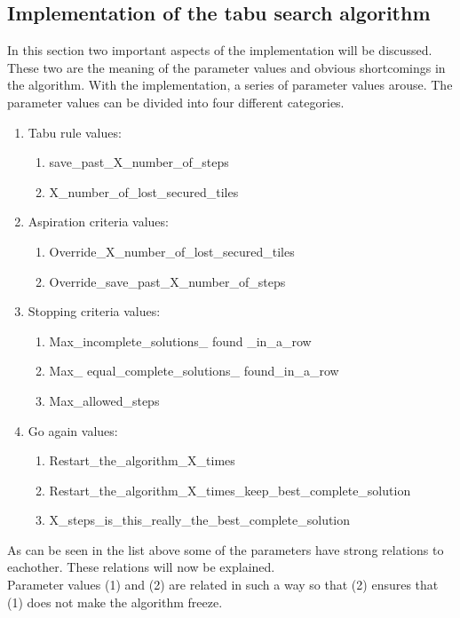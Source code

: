 \subsection{Implementation of the tabu search algorithm}
In this section two important aspects of the implementation will be discussed. These two are the meaning of the parameter values and obvious shortcomings in the algorithm. With the implementation, a series of parameter values arouse. The parameter values can be divided into four different categories.
\begin{enumerate}
\item{} Tabu rule values:
\begin{enumerate}
\item{} save\_past\_X\_number\_of\_steps
\item{} X\_number\_of\_lost\_secured\_tiles
\end{enumerate} 
\item{} Aspiration criteria values:
\begin{enumerate}
\item{} Override\_X\_number\_of\_lost\_secured\_tiles
\item{} Override\_save\_past\_X\_number\_of\_steps
\end{enumerate} 
\item{} Stopping criteria values:
\begin{enumerate}
\item{} Max\_incomplete\_solutions\_ found \_in\_a\_row
\item{} Max\_ equal\_complete\_solutions\_ found\_in\_a\_row
\item{} Max\_allowed\_steps
\end{enumerate} 
\item{} Go again values:
\begin{enumerate}
\item{} Restart\_the\_algorithm\_X\_times
\item{} Restart\_the\_algorithm\_X\_times\_keep\_best\_complete\_solution
\item{} X\_steps\_is\_this\_really\_the\_best\_complete\_solution
\end{enumerate} 
\end{enumerate} 
As can be seen in the list above some of the parameters have strong relations to eachother. These relations will now be explained. \\
Parameter values (1) and (2) are related in such a way so that (2) ensures that (1) does not make the algorithm freeze. \\
